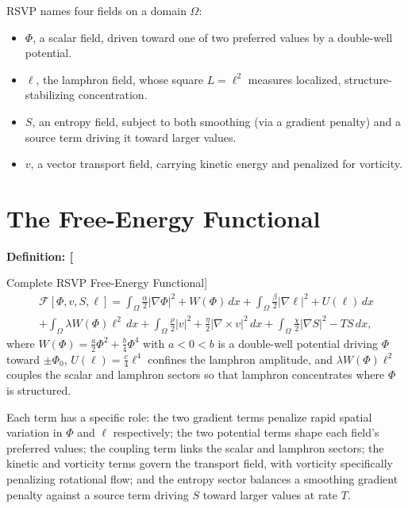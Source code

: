 \documentclass[11pt,fleqn]{book}
\numberwithin{equation}{chapter}
\newenvironment{definition}[1]
  {\begin{definitionEnv}
   \noindent\textbf{Definition: #1}\par\smallskip}
  {\end{definitionEnv}}
\theoremstyle{plain}
\theoremstyle{definition}
\theoremstyle{remark}
\begin{document}
RSVP names four fields on a domain \(\Omega\):

\begin{itemize}
\item \(\Phi\), a scalar field, driven toward one of two preferred values by a double-well potential.
\item \(\ell\), the lamphron field, whose square \(L=\ell^2\) measures localized, structure-stabilizing concentration.
\item \(S\), an entropy field, subject to both smoothing (via a gradient penalty) and a source term driving it toward larger values.
\item \(v\), a vector transport field, carrying kinetic energy and penalized for vorticity.
\end{itemize}

\section{The Free-Energy Functional}

\begin{definition}[Complete RSVP Free-Energy Functional]
\begin{multline}
\mathcal F[\Phi,v,S,\ell] = \int_\Omega \frac{\alpha}{2}|\nabla\Phi|^2 + W(\Phi)\,dx + \int_\Omega \frac{\beta}{2}|\nabla\ell|^2 + U(\ell)\,dx \\
+ \int_\Omega \lambda W(\Phi)\ell^2\,dx + \int_\Omega \frac{\rho}{2}|v|^2 + \frac{\eta}{2}|\nabla\times v|^2\,dx + \int_\Omega \frac{\chi}{2}|\nabla S|^2 - TS\,dx,
\end{multline}
where \(W(\Phi)=\tfrac{a}{2}\Phi^2+\tfrac{b}{4}\Phi^4\) with \(a<0<b\) is a double-well potential driving \(\Phi\) toward \(\pm\Phi_0\), \(U(\ell)=\tfrac{c}{4}\ell^4\) confines the lamphron amplitude, and \(\lambda W(\Phi)\ell^2\) couples the scalar and lamphron sectors so that lamphron concentrates where \(\Phi\) is structured.
\end{definition}

Each term has a specific role: the two gradient terms penalize rapid spatial variation in \(\Phi\) and \(\ell\) respectively; the two potential terms shape each field's preferred values; the coupling term links the scalar and lamphron sectors; the kinetic and vorticity terms govern the transport field, with vorticity specifically penalizing rotational flow; and the entropy sector balances a smoothing gradient penalty against a source term driving \(S\) toward larger values at rate \(T\).
\end{document}
